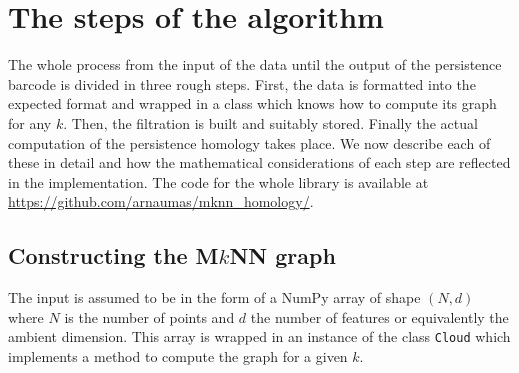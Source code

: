 \documentclass[../main.tex]{subfiles}
\begin{document}
\section{The steps of the algorithm}
The whole process from the input of the data until the output of the persistence barcode
is divided in three rough steps. First, the data is formatted into the expected format and
wrapped in a class which knows how to compute its \MKNN	graph for any \( k \). Then, the
filtration is built and suitably stored. Finally the actual computation of the persistence
homology takes place. We now describe each of these in detail and how the mathematical
considerations of each step are reflected in the implementation. The code for the whole
library is available at \url{https://github.com/arnaumas/mknn_homology/}. 

\subsection{Constructing the M\texorpdfstring{\( k \)}{k}NN graph}
The input is assumed to be in the form of a \textsf{NumPy} array of shape \( (N,d) \)
where \( N \) is the number of points and \( d \) the number of features or equivalently
the ambient dimension. This array is wrapped in an instance of the class \texttt{Cloud}
which implements a method to compute the \MKNN graph for a given \( k \). 
\end{document}
